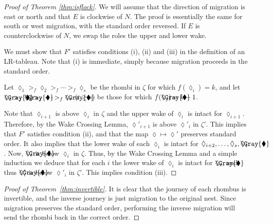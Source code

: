 \documentclass[12pt]{article}
\newcommand{\graylozenge}{\begin{picture}(0,0)(0,0)\put(0,0){$\Gray{\blacklozenge}$}\end{picture}\nolinebreak\lozenge}
\begin{document}
\begin{proof}[Proof of Theorem \ref{thm:isflock}]
We will assume that the direction of migration is east or north
and that $E$ is clockwise of $N$.
The proof is essentially the same for south or west migration,
with the standard order reversed.  If $E$ is counterclockwise of $N$,
we swap the roles the upper and lower wake.

We must show that $F'$ satisfies conditions (i), (ii) and (iii)
in the definition of an LR-tableau.
Note that (i) is immediate,
simply because migration proceeds in the standard order.

Let $\lozenge_1 >_f \lozenge_2 >_f \dotsb >_f \lozenge_s$
be the rhombi in $\zeta$ for which $f(\lozenge_i) = k$,
and let $\graylozenge_1 >_f \graylozenge_2 >_f  
\dotsb >_f \graylozenge_t$  ($t \geq s$) be those for 
which $f(\graylozenge_j) = k-1$.

Note that $\lozenge_{i+1}$ is above $\lozenge_i$ in $\zeta$
and the upper wake of $\lozenge_i$ is intact for $\lozenge_{i+1}$.
Therefore, by the Wake Crossing Lemma, $\lozenge'_{i+1}$ is above 
$\lozenge'_i$ in $\zeta'$.  
This implies that $F'$ satisfies condition (ii), and that the map
$\lozenge \mapsto \lozenge'$ preserves standard order.  It also implies that 
the lower wake of each $\lozenge_i$ is intact for $\lozenge_{i+2}, \dotsc, 
\lozenge_s, \graylozenge_1$.  Now, $\graylozenge_i$ is below
$\lozenge_i$ in $\zeta$.  Thus, by the Wake Crossing Lemma
 and a simple induction we deduce
that for each $i$ the lower wake of $\lozenge_i$ is intact for 
$\graylozenge_i$, and thus $\graylozenge'_i$ is below $\lozenge'_i$
in $\zeta'$.  This implies condition (iii).
\end{proof}

\begin{proof}[Proof of Theorem~\ref{thm:invertible}]
It is clear that the journey of each rhombus is invertible, and
the inverse journey is just migration to the original nest.  Since
migration preserves the standard order, performing the inverse
migration will send the rhombi back in the correct order.
\end{proof}
\end{document}

